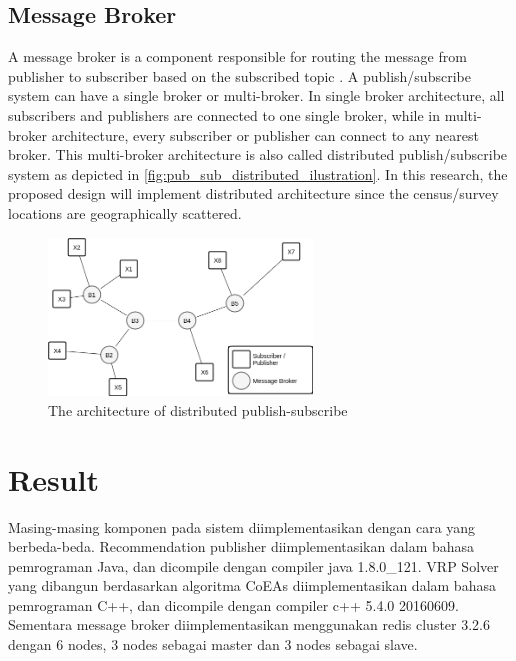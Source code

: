 \documentclass[conference]{IEEEtran}
\begin{document}
\subsection{Message Broker}
\label{ssec:message-broker}
A message broker is a component responsible for routing the message from publisher to subscriber based on the subscribed topic \cite{banavar_efficient_1999}. A publish/subscribe system can have a single broker or multi-broker. In single broker architecture, all subscribers and publishers are connected to one single broker, while in multi-broker architecture, every subscriber or publisher can connect to any nearest broker. This multi-broker architecture is also called distributed publish/subscribe system \cite{muhl_large-scale_2002} as depicted in \autoref{fig:pub_sub_distributed_ilustration}. In this research, the proposed design will implement distributed architecture since the census/survey locations are geographically scattered. 


\begin{figure}[!]
	\centering
	\includegraphics[width=7cm]{Resources/Images/pub_sub_distributed_ilustration}
	\caption{The architecture of distributed publish-subscribe}
	\label{fig:pub_sub_distributed_ilustration}
\end{figure}


\section{Result}
\label{sec:testing}
Masing-masing komponen pada sistem diimplementasikan dengan cara yang berbeda-beda. Recommendation publisher diimplementasikan dalam bahasa pemrograman Java, dan dicompile dengan compiler java 1.8.0\_121. VRP Solver yang dibangun berdasarkan algoritma CoEAs diimplementasikan dalam bahasa pemrograman C++, dan dicompile dengan compiler c++ 5.4.0 20160609. Sementara message broker diimplementasikan menggunakan redis cluster 3.2.6 dengan 6 nodes, 3 nodes sebagai master dan 3 nodes sebagai slave.
\end{document}
